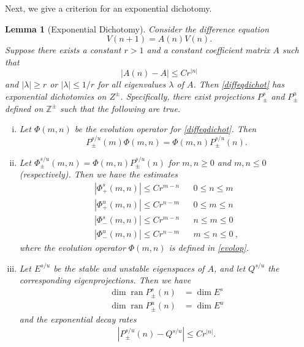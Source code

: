 \documentclass[12pt]{elsarticle}
\def\Z{{\mathbb Z}}
\DeclareMathOperator{\ran}{ran}
\newtheorem{lemma}{Lemma}
\begin{document}
Next, we give a criterion for an exponential dichotomy.

\begin{lemma}[Exponential Dichotomy]\label{dichotomy}
Consider the difference equation
\begin{equation}\label{diffeqdichot}
V(n+1) = A(n) V(n).
\end{equation}
Suppose there exists a constant $r > 1$ and a constant coefficient matrix $A$ such that 
\begin{equation}\label{Anexpdecay}
|A(n) - A| \leq C r^{|n|}
\end{equation}
and $|\lambda| \geq r$ or $|\lambda| \leq 1/r$ for all eigenvalues $\lambda$ of $A$. Then \cref{diffeqdichot} has exponential dichotomies on $Z^\pm$. Specifically, there exist projections $P_\pm^s$ and $P_\pm^u$ defined on $\Z^\pm$ such that the following are true.
\begin{enumerate}[(i)]
\item Let $\Phi(m, n)$ be the evolution operator for \cref{diffeqdichot}. Then 
\begin{equation}\label{projcommute}
P_\pm^{s/u}(m) \Phi(m, n) =  \Phi(m, n) P_\pm^{s/u}(n).
\end{equation}

\item Let $\Phi_\pm^{s/u}(m, n) = \Phi(m, n) P_\pm^{s/u}(n)$ for $m, n \geq 0$ and $m, n \leq 0$ (respectively). Then we have the estimates
\begin{equation*}
\begin{aligned}
|\Phi_+^s(m, n)| \leq C r^{m - n} && 0 \leq n \leq m \\
|\Phi_+^u(m, n)| \leq C r^{n - m} && 0 \leq m \leq n \\
|\Phi_-^s(m, n)| \leq C r^{m - n} && n \leq m \leq 0 \\
|\Phi_-^u(m, n)| \leq C r^{n - m} && m \leq n \leq 0 \:,
\end{aligned}
\end{equation*}
where the evolution operator $\Phi(m, n)$ is defined in \cref{evolop}. 

\item Let $E^{s/u}$ be the stable and unstable eigenspaces of $A$, and let $Q^{s/u}$ the corresponding eigenprojections. Then we have
\begin{align*}
\dim \ran P_\pm^s(n) &= \dim E^s \\
\dim \ran P_\pm^u(n) &= \dim E^u
\end{align*}
and the exponential decay rates
\begin{align}\label{projexpdecay}
| P_\pm^{s/u}(n) - Q^{s/u} | \leq C r^{|n|}.
\end{align}
\end{enumerate}


\end{lemma}
\end{document}
